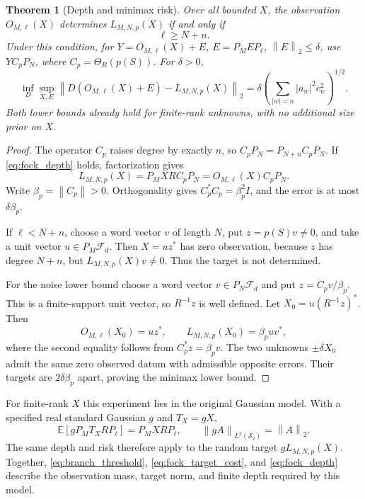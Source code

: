 \documentclass[11pt,a4paper]{amsart}
\numberwithin{equation}{section}
\newtheorem{theorem}{Theorem}[section]
\theoremstyle{definition}
\theoremstyle{remark}
\newcommand{\E}{\mathbb E}
\newcommand{\Sch}{\mathcal S}
\newcommand{\norm}[1]{\left\lVert#1\right\rVert}
\begin{document}
\begin{theorem}[Depth and minimax risk]\label{thm:fock_depth_risk}
Over all bounded $X$, the observation $O_{M,\ell}(X)$ determines $L_{M,N,p}(X)$ if and only if
\begin{equation}\label{eq:fock_depth}
 \ell\ge N+n.
\end{equation}
Under this condition, for $Y=O_{M,\ell}(X)+E$, $E=P_MEP_\ell$, $\norm E_2\le\delta$, use $YC_pP_N$, where $C_p=\Theta_R(p(S))$. For $\delta>0$,
\begin{equation}\label{eq:fock_minimax}
 \inf_D\sup_{X,E}\norm{D(O_{M,\ell}(X)+E)-L_{M,N,p}(X)}_2
 =\delta\left(\sum_{|w|=n}|a_w|^2c_w^2\right)^{1/2}.
\end{equation}
Both lower bounds already hold for finite-rank unknowns, with no additional size prior on $X$.
\end{theorem}
\begin{proof}
The operator $C_p$ raises degree by exactly $n$, so $C_pP_N=P_{N+n}C_pP_N$. If \eqref{eq:fock_depth} holds, factorization gives
\[
 L_{M,N,p}(X)=P_MXR C_pP_N=O_{M,\ell}(X)C_pP_N.
\]
Write $\beta_p=\norm{C_p}>0$. Orthogonality gives $C_p^*C_p=\beta_p^2I$, and the error is at most $\delta\beta_p$.

If $\ell<N+n$, choose a word vector $v$ of length $N$, put $z=p(S)v\ne0$, and take a unit vector $u\in P_M\mathcal F_d$. Then $X=uz^*$ has zero observation, because $z$ has degree $N+n$, but $L_{M,N,p}(X)v\ne0$. Thus the target is not determined.

For the noise lower bound choose a word vector $v\in P_N\mathcal F_d$ and put $z=C_pv/\beta_p$. This is a finite-support unit vector, so $R^{-1}z$ is well defined. Let $X_0=u(R^{-1}z)^*$. Then
\[
 O_{M,\ell}(X_0)=uz^*,\qquad
 L_{M,N,p}(X_0)=\beta_puv^*,
\]
where the second equality follows from $C_p^*z=\beta_pv$. The two unknowns $\pm\delta X_0$ admit the same zero observed datum with admissible opposite errors. Their targets are $2\delta\beta_p$ apart, proving the minimax lower bound.
\end{proof}

For finite-rank $X$ this experiment lies in the original Gaussian model. With a specified real standard Gaussian $g$ and $T_X=gX$,
\[
 \E[gP_MT_XRP_\ell]=P_MXRP_\ell,
 \qquad \norm{gA}_{L^2(\Sch_2)}=\norm A_2.
\]
The same depth and risk therefore apply to the random target $gL_{M,N,p}(X)$. Together, \eqref{eq:branch_threshold}, \eqref{eq:fock_target_cost}, and \eqref{eq:fock_depth} describe the observation mass, target norm, and finite depth required by this model.
\end{document}
